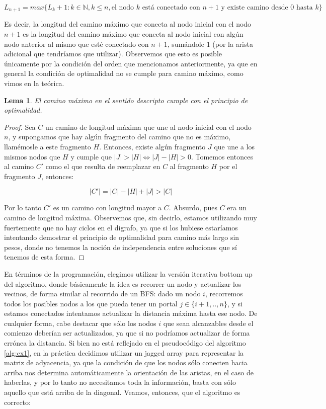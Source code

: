 \documentclass{article}
\newtheorem{lemma}{Lema}[theorem]
\theoremstyle{definition}
\theoremstyle{remark}
\begin{document}
$$L_{n + 1} = max\{L_k + 1 : k \in \mathbb{N}, k \leq n, \text{el nodo } k \text{ está conectado con } n + 1 \text{ y existe camino desde } 0 \text{ hasta } k\}$$

Es decir, la longitud del camino máximo que conecta al nodo inicial con el nodo $n + 1$ es la longitud del camino máximo que conecta al nodo inicial con algún nodo anterior al mismo que esté conectado con $n + 1$, sumándole 1 (por la arista adicional que tendríamos que utilizar). Observemos que esto es posible únicamente por la condición del orden que mencionamos anteriormente, ya que en general la condición de optimalidad no se cumple para camino máximo, como vimos en la teórica.

\begin{lemma}
El camino máximo en el sentido descripto cumple con el principio de optimalidad.
\end{lemma}

\begin{proof}
Sea $C$ un camino de longitud máxima que une al nodo inicial con el nodo $n$, y supongamos que hay algún fragmento del camino que no es máximo, llamémosle a este fragmento $H$. Entonces, existe algún fragmento $J$ que une a los mismos nodos que $H$ y cumple que $|J| > |H| \iff |J| - |H| > 0$. Tomemos entonces al camino $C'$ como el que resulta de reemplazar en $C$ al fragmento $H$ por el fragmento $J$, entonces:

$$|C'| = |C| - |H| + |J| > |C|$$

Por lo tanto $C'$ es un camino con longitud mayor a $C$. Absurdo, pues $C$ era un camino de longitud máxima. Observemos que, sin decirlo, estamos utilizando muy fuertemente que no hay ciclos en el digrafo, ya que si los hubiese estaríamos intentando demostrar el principio de optimalidad para camino más largo sin pesos, donde no tenemos la noción de independencia entre soluciones que sí tenemos de esta forma.
\end{proof}

En términos de la programación, elegimos utilizar la versión iterativa bottom up del algoritmo, donde básicamente la idea es recorrer un nodo y actualizar los vecinos, de forma similar al recorrido de un BFS: dado un nodo $i$, recorremos todos los posibles nodos a los que pueda tener un portal $j \in \{i + 1, .., n\}$, y si estamos conectados intentamos actualizar la distancia máxima hasta ese nodo. De cualquier forma, cabe destacar que sólo los nodos $i$ que sean alcanzables desde el comienzo deberían ser actualizados, ya que si no podríamos actualizar de forma errónea la distancia. Si bien no está reflejado en el pseudocódigo del algoritmo \ref{alg:ex1}, en la práctica decidimos utilizar un jagged array para representar la matriz de adyacencia, ya que la condición de que los nodos sólo conecten hacia arriba nos determina automáticamente la orientación de las aristas, en el caso de haberlas, y por lo tanto no necesitamos toda la información, basta con sólo aquello que está arriba de la diagonal. Veamos, entonces, que el algoritmo es correcto:
\end{document}

